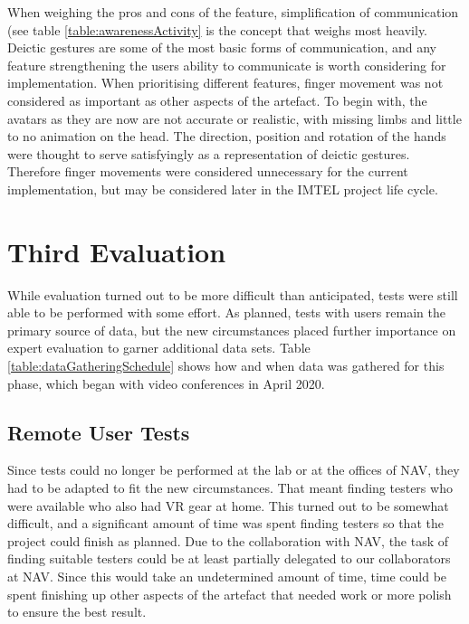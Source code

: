 When weighing the pros and cons of the feature, simplification of communication (see table \ref{table:awarenessActivity} is the concept that weighs most heavily. Deictic gestures are some of the most basic forms of communication, and any feature strengthening the users ability to communicate is worth considering for implementation. When prioritising different features, finger movement was not considered as important as other aspects of the artefact. To begin with, the avatars as they are now are not accurate or realistic, with missing limbs and little to no animation on the head. The direction, position and rotation of the hands were thought to serve satisfyingly as a representation of deictic gestures. Therefore finger movements were considered unnecessary for the current implementation, but may be considered later in the IMTEL project life cycle.



\section{Third Evaluation}
\label{section:evalPhase3}
While evaluation turned out to be more difficult than anticipated, tests were still able to be performed with some effort. As planned, tests with  users remain the primary source of data, but the new circumstances placed further importance on expert evaluation to garner additional data sets. Table \ref{table:dataGatheringSchedule} shows how and when data was gathered for this phase, which began with video conferences in April 2020. 


\subsection{Remote User Tests}
Since tests could no longer be performed at the lab or at the offices of NAV, they had to be adapted to fit the new circumstances. That meant finding testers who were available who also had VR gear at home. This turned out to be somewhat difficult, and a significant amount of time was  spent finding testers so that the project could finish as planned. Due to the collaboration with NAV, the task of finding suitable testers could be at least partially delegated to our collaborators at NAV. Since this would take an undetermined amount of time, time could be spent finishing up other aspects of the artefact that needed work or more polish to ensure the best result.


